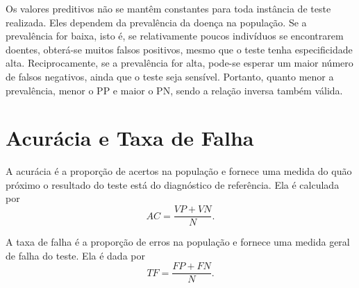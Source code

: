 Os valores preditivos não se mantêm constantes para toda instância de teste realizada. Eles dependem da prevalência da doença na população. Se a prevalência for baixa, isto é, se relativamente poucos indivíduos se encontrarem doentes, obterá-se muitos falsos positivos, mesmo que o teste tenha especificidade alta. Reciprocamente, se a prevalência for alta, pode-se esperar um maior número de falsos negativos, ainda que o teste seja sensível. Portanto, quanto menor a prevalência, menor o PP e maior o PN, sendo a relação inversa também válida.

\section{Acurácia e Taxa de Falha}
A acurácia é a proporção de acertos na população e fornece uma medida do quão próximo o resultado do teste está do diagnóstico de referência. Ela é calculada por
\begin{equation}
    AC = \frac{VP+VN}{N}.
\end{equation}

A taxa de falha é a proporção de erros na população e fornece uma medida geral de falha do teste. Ela é dada por
\begin{equation}
    TF = \frac{FP+FN}{N}.
\end{equation}
